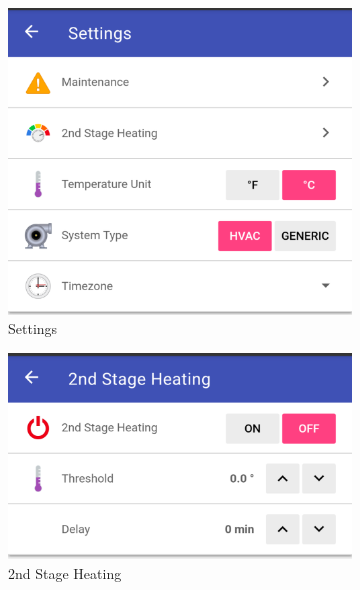\begin{figure}
\begin{subfigure}{0.32\textwidth}
  \centering
  \includegraphics[width=.75\linewidth]{img/ui-settings.png}
  \caption{Settings}
  \label{fig:ui-settings}
\end{subfigure}
\begin{subfigure}{0.33\textwidth}
  \centering
  \includegraphics[width=.75\linewidth]{img/ui-2nd-stage-heating.png}
  \caption{2nd Stage Heating}
  \label{fig:ui-2nd-stage-heating}
\end{subfigure}%
\begin{subfigure}{0.33\textwidth}
  \centering

\end{subfigure}
\end{figure}
